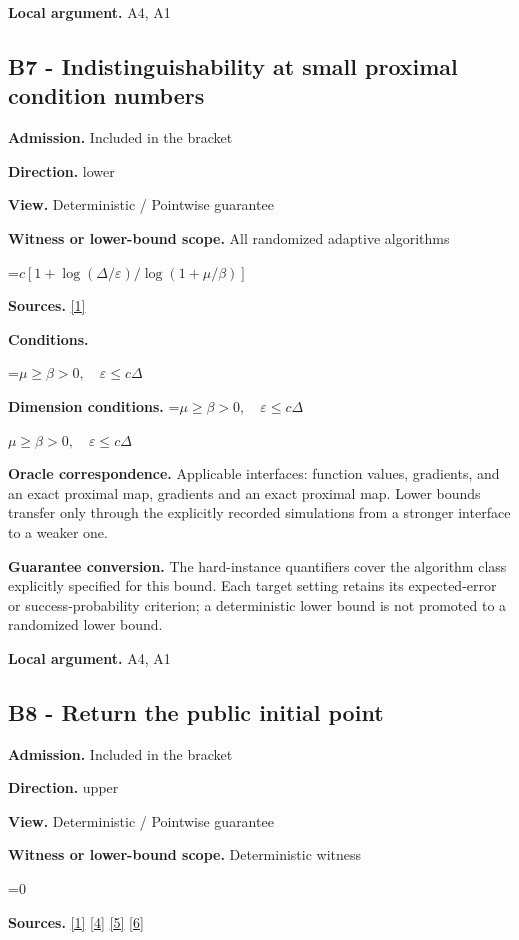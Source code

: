 \documentclass[10pt,a4paper]{article}
\newcommand{\AtlasMath}[1]{\par\begingroup\centering\setbox0=\hbox{$\displaystyle #1$}\ifdim\wd0>1.4\linewidth\typeout{ATLAS WIDE FORMULA: \the\wd0}\fi\ifdim\wd0>\linewidth\resizebox{\linewidth}{!}{\box0}\else\box0\fi\par\endgroup}
\newcommand{\AtlasInlineMath}[1]{\begingroup\setbox0=\hbox{$#1$}\ifdim\wd0>.4\linewidth\endgroup\AtlasMath{#1}\else\endgroup$#1$\fi}
\begin{document}
\textbf{Local argument.} A4, A1

\subsection{B7 - Indistinguishability at small proximal condition numbers}
\textbf{Admission.} Included in the bracket

\textbf{Direction.} lower

\textbf{View.} Deterministic / Pointwise guarantee

\textbf{Witness or lower-bound scope.} All randomized adaptive algorithms

\AtlasMath{c[1+\log(\Delta/\varepsilon)/\log(1+\mu/\beta)]}
\textbf{Sources.} \href{https://www.tau.ac.il/~becka/FISTA.pdf}{[1]}

\textbf{Conditions.} 
\AtlasMath{\mu\ge\beta>0,\quad\varepsilon\le c\Delta}


\textbf{Dimension conditions.} \AtlasInlineMath{\mu\ge\beta>0,\quad\varepsilon\le c\Delta}

\textbf{Oracle correspondence.} Applicable interfaces: function values, gradients, and an exact proximal map, gradients and an exact proximal map. Lower bounds transfer only through the explicitly recorded simulations from a stronger interface to a weaker one.

\textbf{Guarantee conversion.} The hard-instance quantifiers cover the algorithm class explicitly specified for this bound. Each target setting retains its expected-error or success-probability criterion; a deterministic lower bound is not promoted to a randomized lower bound.

\textbf{Local argument.} A4, A1

\subsection{B8 - Return the public initial point}
\textbf{Admission.} Included in the bracket

\textbf{Direction.} upper

\textbf{View.} Deterministic / Pointwise guarantee

\textbf{Witness or lower-bound scope.} Deterministic witness

\AtlasMath{0}
\textbf{Sources.} \href{https://www.tau.ac.il/~becka/FISTA.pdf}{[1]} \href{https://arxiv.org/pdf/1405.4980}{[4]} \href{https://www2.isye.gatech.edu/~nemirovs/MOR_AccuracyCertificates.pdf}{[5]} \href{https://arxiv.org/pdf/2609.20701}{[6]}
\end{document}
